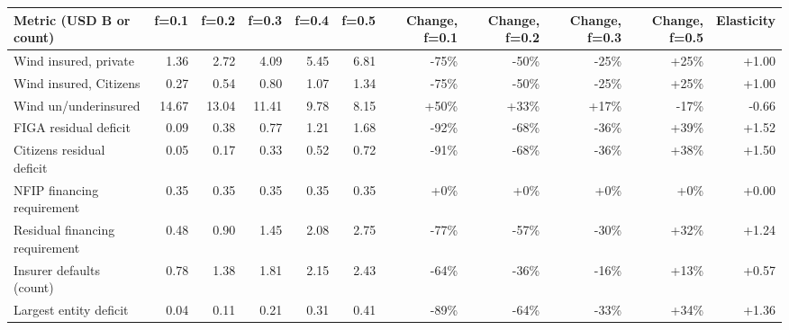 \begin{tabular}{lrrrrrrrrrr}
\toprule
Metric (USD B or count) & f=0.1 & f=0.2 & f=0.3 & f=0.4 & f=0.5 & Change, f=0.1 & Change, f=0.2 & Change, f=0.3 & Change, f=0.5 & Elasticity \\
\midrule
Wind insured, private & 1.36 & 2.72 & 4.09 & 5.45 & 6.81 & -75\% & -50\% & -25\% & +25\% & +1.00 \\
Wind insured, Citizens & 0.27 & 0.54 & 0.80 & 1.07 & 1.34 & -75\% & -50\% & -25\% & +25\% & +1.00 \\
Wind un/underinsured & 14.67 & 13.04 & 11.41 & 9.78 & 8.15 & +50\% & +33\% & +17\% & -17\% & -0.66 \\
\midrule
FIGA residual deficit & 0.09 & 0.38 & 0.77 & 1.21 & 1.68 & -92\% & -68\% & -36\% & +39\% & +1.52 \\
Citizens residual deficit & 0.05 & 0.17 & 0.33 & 0.52 & 0.72 & -91\% & -68\% & -36\% & +38\% & +1.50 \\
NFIP financing requirement & 0.35 & 0.35 & 0.35 & 0.35 & 0.35 & +0\% & +0\% & +0\% & +0\% & +0.00 \\
Residual financing requirement & 0.48 & 0.90 & 1.45 & 2.08 & 2.75 & -77\% & -57\% & -30\% & +32\% & +1.24 \\
\midrule
Insurer defaults (count) & 0.78 & 1.38 & 1.81 & 2.15 & 2.43 & -64\% & -36\% & -16\% & +13\% & +0.57 \\
Largest entity deficit & 0.04 & 0.11 & 0.21 & 0.31 & 0.41 & -89\% & -64\% & -33\% & +34\% & +1.36 \\
\bottomrule
\end{tabular}
